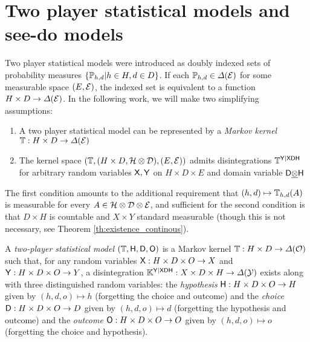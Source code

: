 
\section{Two player statistical models and see-do models}

Two player statistical models were introduced as doubly indexed sets of probability measures $\{\mathbb{P}_{h,d}|h\in H,d\in D\}$. If each $\mathbb{P}_{h,d}\in \Delta(\mathcal{E})$ for some measurable space $(E,\mathcal{E})$, the indexed set is equivalent to a function $H\times D\to \Delta(\mathcal{E})$. In the following work, we will make two simplifying assumptions:

\begin{enumerate}
    \item A two player statistical model can be represented by a \emph{Markov kernel} $\mathbb{T}:H\times D\to \Delta(\mathcal{E})$
    \item The kernel space $(\mathbb{T},(H\times D,\mathcal{H}\otimes\mathcal{D}),(E,\mathcal{E}))$ admits disintegrations $\mathbb{T}^{\mathsf{Y}|\mathsf{XDH}}$ for arbitrary random variables $\mathsf{X},\mathsf{Y}$ on $H\times D\times E$ and domain variable $\mathsf{D}\underline{\otimes}\mathsf{H}$
\end{enumerate}

The first condition amounts to the additional requirement that $(h,d)\mapsto \mathbb{T}_{h,d}(A)$ is measurable for every $A\in \mathcal{H}\otimes\mathcal{D}\otimes\mathcal{E}$, and sufficient for the second condition is that $D\times H$ is countable and $X\times Y$ standard measurable (though this is not necessary, see Theorem \ref{th:existence_continous}).

\begin{definition}\label{def:2p_stat}
A \emph{two-player statistical model} $(\mathbb{T},\mathsf{H},\mathsf{D},\mathsf{O})$ is a Markov kernel $\mathbb{T}:H\times D\to \Delta(\mathcal{O})$ such that, for any random variables $\mathsf{X}: H\times D\times O\to X$ and $\mathsf{Y}:H\times D\times O\to Y$, a disintegration $\mathbb{K}^{\mathsf{Y}|\mathsf{XDH}}:X\times D\times H\to \Delta(\mathcal{Y})$ exists along with three distinguished random variables: the \emph{hypothesis} $\mathsf{H}:H\times D\times O\to H$ given by $(h,d,o)\mapsto h$ (forgetting the choice and outcome) and the \emph{choice} $\mathsf{D}:H\times D\times O\to D$ given by $(h,d,o)\mapsto d$ (forgetting the hypothesis and outcome) and the \emph{outcome} $\mathsf{O}:H\times D\times O\to O$ given by $(h,d,o)\mapsto o$ (forgetting the choice and hypothesis).
\end{definition}

